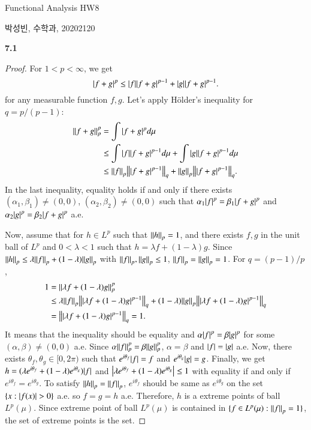 \documentclass[a4paper, 12pt]{article}
\theoremstyle{Mydefinition}
\theoremstyle{Mytheorem}
\begin{document}
\thispagestyle{myfirstpage}
\begin{center}
	\Large{Functional Analysis HW8}
\end{center}
박성빈, 수학과, 20202120

\noindent \textbf{7.1}
\begin{proof}
For $1<p<\infty$, we get
\begin{equation}
    \abs{f+g}^p\leq \abs{f}\abs{f+g}^{p-1} + \abs{g}\abs{f+g}^{p-1}.
\end{equation}
for any measurable function $f,g$. Let's apply H\"older's inequality for $q=p/(p-1)$:
\begin{equation}
\begin{split}
    \norm{f+g}_p^p&=\int \abs{f+g}^p d\mu \\
    &\leq \int \abs{f}\abs{f+g}^{p-1}d\mu+\int\abs{g}\abs{f+g}^{p-1} d\mu\\
    &\leq \norm{f}_p\norm{\abs{f+g}^{p-1}}_q + \norm{g}_p\norm{\abs{f+g}^{p-1}}_q.
\end{split}
\end{equation}
In the last inequality, equality holds if and only if there exists $(\alpha_1,\beta_1)\neq (0,0)$, $(\alpha_2,\beta_2)\neq (0,0)$ such that $\alpha_1\abs{f}^p = \beta_1\abs{f+g}^p$ and $\alpha_2\abs{g}^p = \beta_2\abs{f+g}^p$ a.e.

Now, assume that for $h\in L^p$ such that $\norm{h}_p = 1$, and there exists $f,g$ in the unit ball of $L^p$ and $0<\lambda<1$ such that $h = \lambda f+(1-\lambda)g$. Since $\norm{h}_p\leq \lambda\norm{f}_p+(1-\lambda)\norm{g}_p$ with $\norm{f}_p,\norm{g}_p\leq 1$, $\norm{f}_p = \norm{g}_p = 1$.
For $q=(p-1)/p$,
\begin{equation}
\begin{split}
    1 &= \norm{\lambda f+(1-\lambda)g}^p_p \\
    &\leq  \lambda \norm{f}_p\norm{\abs{\lambda f+(1-\lambda)g}^{p-1}}_q+(1-\lambda)\norm{g}_p\norm{\abs{\lambda f+(1-\lambda)g}^{p-1}}_q \\
    &= \norm{\abs{\lambda f+(1-\lambda)g}^{p-1}}_q = 1.
\end{split}
\end{equation}
It means that the inequality should be equality and $\alpha\abs{f}^p = \beta\abs{g}^p$ for some $(\alpha,\beta)\neq (0,0)$ a.e. Since $\alpha \norm{f}_p^p = \beta\norm{g}_p^p$, $\alpha=\beta$ and $\abs{f}=\abs{g}$ a.e. Now, there exists $\theta_f,\theta_g\in [0,2\pi)$ such that $e^{i\theta_f}\abs{f}=f$ and $e^{i\theta_g}\abs{g} = g$. Finally, we get $h = (\lambda e^{i\theta_f}+(1-\lambda)e^{i\theta_g})\abs{f}$ and $\abs{\lambda e^{i\theta_f}+(1-\lambda)e^{i\theta_g}}\leq 1$ with equality if and only if $e^{i\theta_f}=e^{i\theta_g}$. To satisfy $\norm{h}_p=\norm{f}_p$, $e^{i\theta_f}$ should be same as $e^{i\theta_g}$ on the set $\{x:\abs{f(x)}>0\}$ a.e. so $f=g=h$ a.e. Therefore, $h$ is a extreme points of ball $L^p(\mu)$. Since extreme point of ball $L^p(\mu)$ is contained in $\{f\in L^p(\mu):\norm{f}_p=1\}$, the set of extreme points is the set.
\end{proof}
\end{document}
